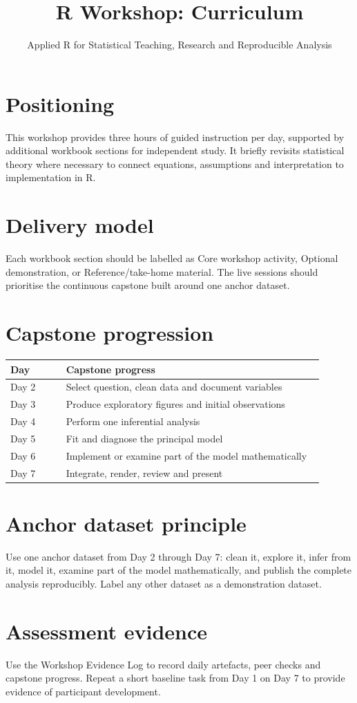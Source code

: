 \documentclass[11pt]{article}
\title{R Workshop: Curriculum}
\author{Applied R for Statistical Teaching, Research and Reproducible Analysis}
\date{}
\begin{document}
\maketitle

\section*{Positioning}
This workshop provides three hours of guided instruction per day, supported by additional workbook sections for independent study. It briefly revisits statistical theory where necessary to connect equations, assumptions and interpretation to implementation in R.

\section*{Delivery model}
Each workbook section should be labelled as Core workshop activity, Optional demonstration, or Reference/take-home material. The live sessions should prioritise the continuous capstone built around one anchor dataset.

\section*{Capstone progression}
\begin{longtable}{p{0.16\linewidth}p{0.74\linewidth}}
\toprule
Day & Capstone progress \\
\midrule
Day 2 & Select question, clean data and document variables \\
Day 3 & Produce exploratory figures and initial observations \\
Day 4 & Perform one inferential analysis \\
Day 5 & Fit and diagnose the principal model \\
Day 6 & Implement or examine part of the model mathematically \\
Day 7 & Integrate, render, review and present \\
\bottomrule
\end{longtable}

\section*{Anchor dataset principle}
Use one anchor dataset from Day 2 through Day 7: clean it, explore it, infer from it, model it, examine part of the model mathematically, and publish the complete analysis reproducibly. Label any other dataset as a demonstration dataset.

\section*{Assessment evidence}
Use the Workshop Evidence Log to record daily artefacts, peer checks and capstone progress. Repeat a short baseline task from Day 1 on Day 7 to provide evidence of participant development.
\end{document}
